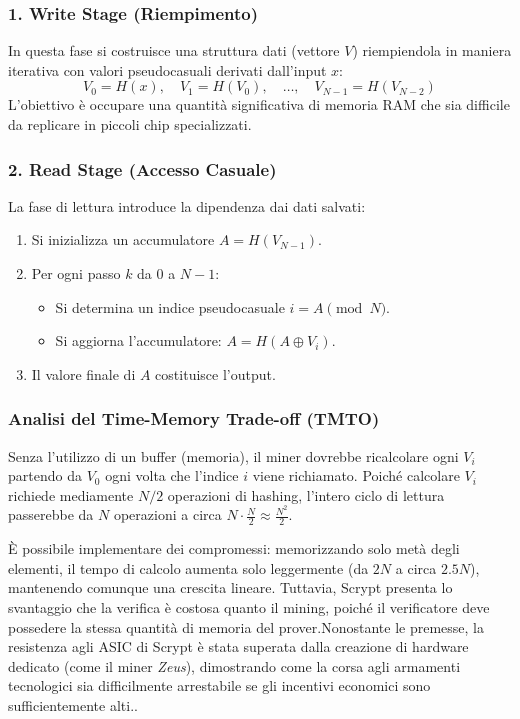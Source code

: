 \subsubsection*{1. Write Stage (Riempimento)}
In questa fase si costruisce una struttura dati (vettore $V$) riempiendola in maniera iterativa con valori pseudocasuali derivati dall'input $x$:
\[V_0 = H(x), \quad V_1 = H(V_0), \quad \dots, \quad V_{N-1} = H(V_{N-2})\]
L'obiettivo è occupare una quantità significativa di memoria RAM che sia difficile da replicare in piccoli chip specializzati.
\subsubsection*{2. Read Stage (Accesso Casuale)}
La fase di lettura introduce la dipendenza dai dati salvati:
\begin{enumerate}
    \item Si inizializza un accumulatore $A = H(V_{N-1})$.
    \item Per ogni passo $k$ da $0$ a $N-1$:
    \begin{itemize}
        \item Si determina un indice pseudocasuale $i = A \pmod N$.
        \item Si aggiorna l'accumulatore: $A = H(A \oplus V_i)$.
    \end{itemize}
    \item Il valore finale di $A$ costituisce l'output.
\end{enumerate}
\subsubsection*{Analisi del Time-Memory Trade-off (TMTO)}
Senza l'utilizzo di un buffer (memoria), il miner dovrebbe ricalcolare ogni $V_i$ partendo da $V_0$ ogni volta che l'indice $i$ viene richiamato. Poiché calcolare $V_i$ richiede mediamente $N/2$ operazioni di hashing, l'intero ciclo di lettura passerebbe da $N$ operazioni a circa $N \cdot \frac{N}{2} \approx \frac{N^2}{2}$.

È possibile implementare dei compromessi: memorizzando solo metà degli elementi, il tempo di calcolo aumenta solo leggermente (da $2N$ a circa $2.5N$), mantenendo comunque una crescita lineare. 
Tuttavia, Scrypt presenta lo svantaggio che la verifica è costosa quanto il mining, poiché il verificatore deve possedere la stessa quantità di memoria del prover.Nonostante le premesse, la resistenza agli ASIC di Scrypt è stata superata dalla creazione di hardware dedicato (come il miner \textit{Zeus}), dimostrando come la corsa agli armamenti tecnologici sia difficilmente arrestabile se gli incentivi economici sono sufficientemente alti..

